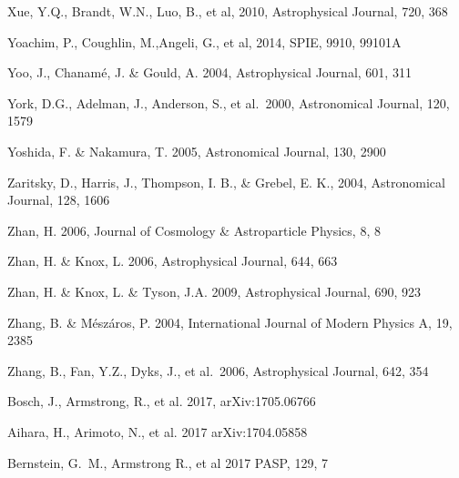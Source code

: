 \documentclass[twocolumn]{aastex61}
\begin{document}
\begin{thebibliography}{}
 Xue, Y.Q., Brandt, W.N., Luo, B., et al, 2010,  Astrophysical Journal, 720, 368

 Yoachim, P., Coughlin, M.,Angeli, G., et al, 2014, SPIE, 9910, 99101A

 Yoo, J., Chanam\'{e}, J. \& Gould, A. 2004, Astrophysical Journal, 601, 311

 York, D.G., Adelman, J., Anderson, S., et al.~2000, Astronomical Journal, 120, 1579

 Yoshida, F. \& Nakamura, T. 2005, Astronomical Journal, 130, 2900

 Zaritsky, D., Harris, J., Thompson, I. B., \& Grebel, E. K., 2004, Astronomical Journal, 128, 1606

 Zhan, H. 2006, Journal of Cosmology \& Astroparticle Physics, 8, 8

 Zhan, H. \& Knox, L. 2006,  Astrophysical Journal, 644, 663

 Zhan, H. \& Knox, L. \& Tyson, J.A. 2009,  Astrophysical Journal, 690, 923

 Zhang, B. \& M\'{e}sz\'{a}ros, P. 2004, International Journal of Modern Physics A, 19, 2385

 Zhang, B., Fan, Y.Z., Dyks, J., et al.~2006,  Astrophysical Journal, 642, 354

 Bosch, J., Armstrong, R., et al. 2017, arXiv:1705.06766

 Aihara, H., Arimoto, N., et al. 2017 arXiv:1704.05858

 Bernstein, G.~M., Armstrong R., et al 2017 PASP, 129, 7

\end{thebibliography}
\end{document}
